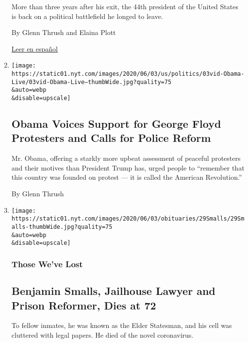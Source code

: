 \begin{enumerate}
  More than three years after his exit, the 44th president of the United
  States is back on a political battlefield he longed to leave.

  By Glenn Thrush and Elaina Plott

  \href{https://www.nytimes.com/es/2020/06/30/espanol/obama-biden-trump.html}{Leer
  en español}
\item
  \href{/2020/06/03/us/politics/obama-speech-town-hall.html}{}

  \texttt{[image: https://static01.nyt.com/images/2020/06/03/us/politics/03vid-Obama-Live/03vid-Obama-Live--thumbWide.jpg?quality=75\\\&auto=webp\\\&disable=upscale]}

  \hypertarget{obama-voices-support-for-george-floyd-protesters-and-calls-for-police-reform}{%
  \subsection{Obama Voices Support for George Floyd Protesters and Calls
  for Police
  Reform}\label{obama-voices-support-for-george-floyd-protesters-and-calls-for-police-reform}}

  Mr. Obama, offering a starkly more upbeat assessment of peaceful
  protesters and their motives than President Trump has, urged people to
  ``remember that this country was founded on protest --- it is called
  the American Revolution.''

  By Glenn Thrush
\item
  \href{/2020/05/31/obituaries/benjamin-smalls-dead.html}{}

  \texttt{[image: https://static01.nyt.com/images/2020/06/03/obituaries/29Smalls/29Smalls-thumbWide.jpg?quality=75\\\&auto=webp\\\&disable=upscale]}

  \hypertarget{those-weve-lost}{%
  \subsubsection{Those We've Lost}\label{those-weve-lost}}

  \hypertarget{benjamin-smalls-jailhouse-lawyer-and-prison-reformer-dies-at-72}{%
  \subsection{Benjamin Smalls, Jailhouse Lawyer and Prison Reformer,
  Dies at
  72}\label{benjamin-smalls-jailhouse-lawyer-and-prison-reformer-dies-at-72}}

  To fellow inmates, he was known as the Elder Statesman, and his cell
  was cluttered with legal papers. He died of the novel coronavirus.


\end{enumerate}
